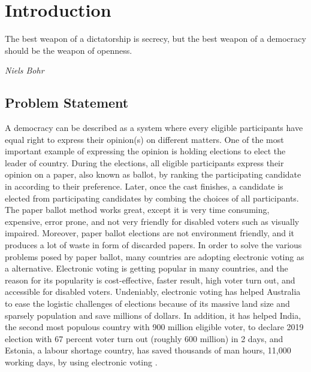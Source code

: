 \chapter{Introduction}
\label{cha:intro}

\epigraph{The best weapon of a dictatorship is secrecy, but the best weapon of a democracy should be the weapon of openness.} 
{\textit{Niels Bohr}} 

\section{Problem Statement}

A democracy can be described as a system where every eligible participants have equal right to express their opinion(s) on different matters. 
One of the most important example of expressing the opinion is holding elections to elect the leader of country. During the 
elections, all eligible participants express their opinion on a paper, also known as ballot, by ranking the participating candidate in 
according to their preference. Later, once the cast finishes, a candidate is elected from participating candidates by 
combing  the choices of all participants.  The paper ballot method works great, except it is very time consuming, expensive, error prone, 
and not very friendly for disabled voters such as visually impaired. 
Moreover, paper ballot elections are not environment friendly, and it produces a lot of waste in form of discarded papers. 
In order to solve the various problems posed by paper ballot, many countries are adopting electronic voting as a alternative. 
Electronic voting is 
getting popular in many countries, and the reason for its popularity is cost-effective, faster result, high voter turn out, 
and accessible for disabled voters.  
Undeniably, electronic voting has helped Australia to ease the logistic challenges of elections because of its massive land size and sparsely 
population and save millions of dollars.  In addition, it has helped India, the second most populous country with 900 million eligible voter, to declare 
2019 election with 67 percent voter turn out (roughly 600 million) in 2 days, and  Estonia, a labour shortage country, has saved 
thousands of man hours, 11,000 working days, by using electronic voting \citep{Estonia}.

